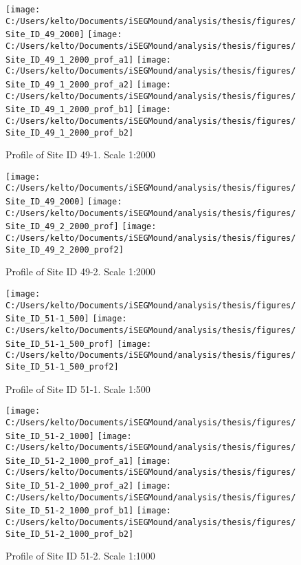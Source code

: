 \documentclass[
  12pt,
]{article}
\begin{document}
\begin{figure}
\texttt{[image: C:/Users/kelto/Documents/iSEGMound/analysis/thesis/figures/Site\_ID\_49\_2000]} \texttt{[image: C:/Users/kelto/Documents/iSEGMound/analysis/thesis/figures/Site\_ID\_49\_1\_2000\_prof\_a1]} \texttt{[image: C:/Users/kelto/Documents/iSEGMound/analysis/thesis/figures/Site\_ID\_49\_1\_2000\_prof\_a2]} \texttt{[image: C:/Users/kelto/Documents/iSEGMound/analysis/thesis/figures/Site\_ID\_49\_1\_2000\_prof\_b1]} \texttt{[image: C:/Users/kelto/Documents/iSEGMound/analysis/thesis/figures/Site\_ID\_49\_1\_2000\_prof\_b2]} \caption{Profile of Site ID 49-1. Scale 1:2000}\label{fig:FigureAOI1-49-1}
\end{figure}

\begin{figure}
\texttt{[image: C:/Users/kelto/Documents/iSEGMound/analysis/thesis/figures/Site\_ID\_49\_2000]} \texttt{[image: C:/Users/kelto/Documents/iSEGMound/analysis/thesis/figures/Site\_ID\_49\_2\_2000\_prof]} \texttt{[image: C:/Users/kelto/Documents/iSEGMound/analysis/thesis/figures/Site\_ID\_49\_2\_2000\_prof2]} \caption{Profile of Site ID 49-2. Scale 1:2000}\label{fig:FigureAOI1-49-2}
\end{figure}

\begin{figure}
\texttt{[image: C:/Users/kelto/Documents/iSEGMound/analysis/thesis/figures/Site\_ID\_51-1\_500]} \texttt{[image: C:/Users/kelto/Documents/iSEGMound/analysis/thesis/figures/Site\_ID\_51-1\_500\_prof]} \texttt{[image: C:/Users/kelto/Documents/iSEGMound/analysis/thesis/figures/Site\_ID\_51-1\_500\_prof2]} \caption{Profile of Site ID 51-1. Scale 1:500}\label{fig:FigureAOI1-51-1}
\end{figure}

\begin{figure}
\texttt{[image: C:/Users/kelto/Documents/iSEGMound/analysis/thesis/figures/Site\_ID\_51-2\_1000]} \texttt{[image: C:/Users/kelto/Documents/iSEGMound/analysis/thesis/figures/Site\_ID\_51-2\_1000\_prof\_a1]} \texttt{[image: C:/Users/kelto/Documents/iSEGMound/analysis/thesis/figures/Site\_ID\_51-2\_1000\_prof\_a2]} \texttt{[image: C:/Users/kelto/Documents/iSEGMound/analysis/thesis/figures/Site\_ID\_51-2\_1000\_prof\_b1]} \texttt{[image: C:/Users/kelto/Documents/iSEGMound/analysis/thesis/figures/Site\_ID\_51-2\_1000\_prof\_b2]} \caption{Profile of Site ID 51-2. Scale 1:1000}\label{fig:FigureAOI1-51-2}
\end{figure}
\end{document}
